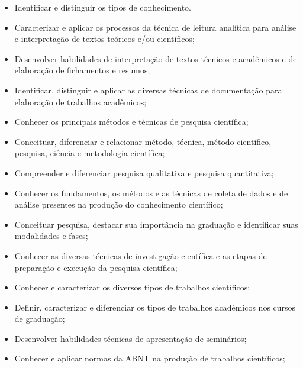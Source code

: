 \begin{itemize}


\item Identificar e distinguir os tipos de conhecimento.

\item Caracterizar e aplicar os processos da técnica de leitura analítica para análise e interpretação de textos teóricos e/ou científicos;

\item Desenvolver habilidades de interpretação de textos técnicos e acadêmicos e de elaboração de fichamentos e resumos;

\item Identificar, distinguir e aplicar as diversas técnicas de documentação para elaboração de trabalhos acadêmicos;

\item Conhecer os principais métodos e técnicas de pesquisa científica;

\item Conceituar, diferenciar e relacionar método, técnica, método científico, pesquisa, ciência e metodologia científica;

\item Compreender e diferenciar pesquisa qualitativa e pesquisa quantitativa;

\item Conhecer os fundamentos, os métodos e as técnicas de coleta de dados e de análise presentes na produção do conhecimento científico;

\item Conceituar pesquisa, destacar sua importância na graduação e identificar suas modalidades e fases;

\item Conhecer as diversas técnicas de investigação científica e as etapas de preparação e execução da pesquisa científica;

\item Conhecer e caracterizar os diversos tipos de trabalhos científicos;

\item Definir, caracterizar e diferenciar os tipos de trabalhos acadêmicos nos cursos de graduação;

\item Desenvolver habilidades técnicas de apresentação de seminários;

\item Conhecer e aplicar normas da ABNT na produção de trabalhos científicos;


\end{itemize}
